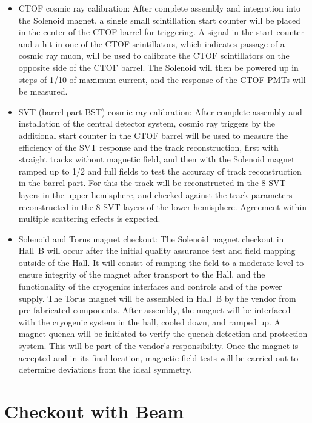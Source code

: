 \begin{itemize}
\item CTOF cosmic ray calibration: After complete assembly and integration 
into the Solenoid magnet, a single small scintillation start counter will 
be placed in the center of the CTOF barrel for triggering. A signal in the 
start counter and a hit in one of the CTOF scintillators, which indicates 
passage of a cosmic ray muon, will be used to calibrate the CTOF 
scintillators on the opposite side of the CTOF barrel.  The Solenoid will 
then be powered up in steps of 1/10 of maximum current, and the response of 
the CTOF PMTs will be measured.   

\item SVT (barrel part BST) cosmic ray calibration: After complete assembly 
and installation of the central detector system, cosmic ray triggers by the 
additional start counter in the CTOF barrel will be used to measure the 
efficiency of the SVT response and the track reconstruction, first with 
straight tracks without magnetic field, and then with the Solenoid magnet 
ramped up to 1/2 and full fields to test the accuracy of track 
reconstruction in the barrel part.  For this the track will be reconstructed 
in the 8 SVT layers in the upper hemisphere, and checked against the track 
parameters reconstructed in the 8 SVT layers of the lower hemisphere. 
Agreement within multiple scattering effects is expected.      

\item Solenoid and Torus magnet checkout: The Solenoid magnet checkout in 
Hall~B will occur after the initial quality assurance test and field 
mapping outside of the Hall.  It will consist of ramping the field to a 
moderate level to ensure integrity of the magnet after transport to the 
Hall, and the functionality of the cryogenics interfaces and controls and 
of the power supply.  The Torus magnet will be assembled in Hall~B by the 
vendor from pre-fabricated components.  After assembly, the magnet will be 
interfaced with the cryogenic system in the hall, cooled down, and ramped 
up.  A magnet quench will be initiated to verify the quench detection and 
protection system.  This will be part of the vendor's responsibility.  Once 
the magnet is accepted and in its final location, magnetic field tests will
be carried out to determine deviations from the ideal symmetry.

\end{itemize}

\section{Checkout with Beam}

